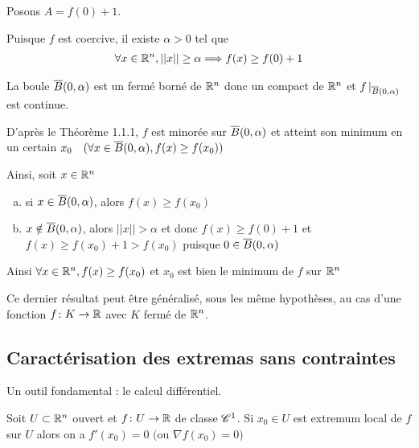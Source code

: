 \documentclass[french,a4paper,10pt]{article}
\begin{document}
	\begin{oc-proof}
		Posons $A=f(0)+1$.
		
		Puisque $f$ est coercive, il existe $\alpha>0$ tel que
			\[\begin{aligned}
				\forall x\in\mathbb{R}^n,||x||\ge\alpha\Longrightarrow f(x)\ge f(0)+1
			\end{aligned}\]
		
		La boule $\overline{B}(0, \alpha)$ est un fermé borné de $\mathbb{R}^n$ donc un compact de $\mathbb{R}^n$ et $f\mathop{}\!|_{\overline{B}(0, \alpha)}$ est continue.
		
		D'après le Théorème 1.1.1, $f$ est minorée sur $\overline{B}(0, \alpha)$ et atteint son minimum en un certain $x_0\quad(\forall x\in \overline{B}(0, \alpha), f(x)\ge f(x_0))$
		
		Ainsi, soit $x\in \mathbb{R}^n$
		\begin{enumerate}[a)]
			\item si $x\in \overline{B}(0, \alpha)$, alors $f(x)\ge f(x_0)$
			\item $x\notin \overline{B}(0, \alpha)$, alors $||x||>\alpha$ et donc $f(x)\ge f(0)+1$ et $f(x)\ge f(x_0)+1>f(x_0)$ puisque $0\in \overline{B}(0, \alpha)$
		\end{enumerate}
	
		Ainsi $\forall x\in\mathbb{R}^n,f(x)\ge f(x_0)$ et $x_0$ est bien le minimum de $f$ sur $\mathbb{R}^n$
		
	\end{oc-proof}

	\begin{oc-remark}
		Ce dernier résultat peut être généralisé, sous les même hypothèses, au cas d'une fonction $f\colon K\to\mathbb{R}$ avec $K$ fermé de $\mathbb{R}^n$.
		
	\end{oc-remark}

	\subsection{Caractérisation des extremas sans contraintes}
	
	Un outil fondamental : le calcul différentiel.
	
	\begin{oc-theorem}
		Soit $U\subset \mathbb{R}^n$ ouvert et $f\colon U\to\mathbb{R}$ de classe $\mathscr{C}^1$. Si $x_0\in U$ est extremum local de $f$ sur $U$ alors on a $f'(x_0)=0$ $($ou $\nabla f(x_0)=0)$
		
	\end{oc-theorem}
\end{document}

